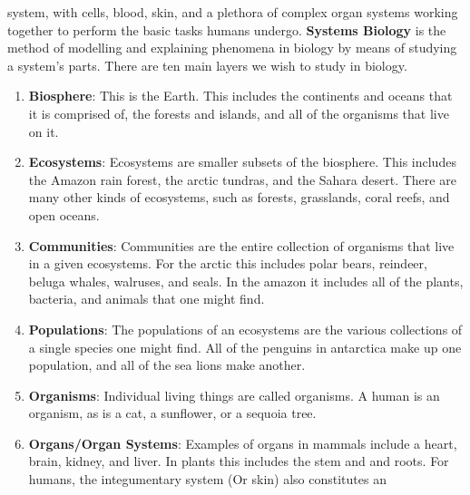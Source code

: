 \documentclass[crop=false,class=book,oneside]{standalone}
\begin{document}
        system, with cells, blood, skin, and a plethora
        of complex organ systems working together to
        perform the basic tasks humans undergo.
        \textbf{Systems Biology} is the method of
        modelling and explaining phenomena in biology
        by means of studying a system's parts. There
        are ten main layers we wish to study in biology.
        \begin{enumerate}
            \item \textbf{Biosphere}: This is the Earth.
                  This includes the continents and oceans
                  that it is comprised of, the forests
                  and islands, and all of the organisms
                  that live on it.
            \item \textbf{Ecosystems}: Ecosystems are
                  smaller subsets of the biosphere. This
                  includes the Amazon rain forest, the
                  arctic tundras, and the Sahara desert.
                  There are many other kinds of ecosystems,
                  such as forests, grasslands, coral reefs,
                  and open oceans.
            \item \textbf{Communities}: Communities are the
                  entire collection of organisms that live
                  in a given ecosystems. For the arctic
                  this includes polar bears, reindeer,
                  beluga whales, walruses, and seals.
                  In the amazon it includes all of the
                  plants, bacteria, and animals that
                  one might find.
            \item \textbf{Populations}: The populations
                  of an ecosystems are the various
                  collections of a single species one
                  might find. All of the penguins in
                  antarctica make up one population, and
                  all of the sea lions make another.
            \item \textbf{Organisms}: Individual living
                  things are called organisms. A human
                  is an organism, as is a cat, a sunflower,
                  or a sequoia tree.
            \item \textbf{Organs/Organ Systems}:
                  Examples of organs in mammals include
                  a heart, brain, kidney, and liver. In
                  plants this includes the stem and
                  and roots. For humans, the integumentary
                  system (Or skin) also constitutes an

\end{enumerate}
\end{document}
